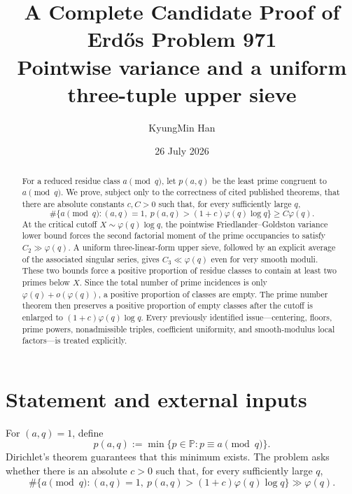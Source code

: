 \documentclass[11pt]{article}
\title{\bfseries A Complete Candidate Proof of Erd\H{o}s Problem 971\\[0.4em]
\large Pointwise variance and a uniform three-tuple upper sieve}
\author{KyungMin Han}
\date{26 July 2026}
\theoremstyle{definition}
\theoremstyle{remark}
\newcommand{\ph}{\varphi}
\newcommand{\Pp}{\mathbb P}
\newcommand{\1}{\mathbf 1}
\begin{document}
\maketitle



\begin{center}
\end{center}

\begin{abstract}
For a reduced residue class $a\pmod q$, let $p(a,q)$ be the least prime congruent to $a\pmod q$.
We prove, subject only to the correctness of cited published theorems, that there are absolute constants $c,C>0$ such that, for every sufficiently large $q$,
\[
 \#\{a\pmod q:(a,q)=1,\ p(a,q)>(1+c)\ph(q)\log q\}\ge C\ph(q).
\]
At the critical cutoff $X\sim\ph(q)\log q$, the pointwise Friedlander--Goldston variance lower bound forces the second factorial moment of the prime occupancies to satisfy $C_2\gg\ph(q)$.
A uniform three-linear-form upper sieve, followed by an explicit average of the associated singular series, gives $C_3\ll\ph(q)$ even for very smooth moduli.
These two bounds force a positive proportion of residue classes to contain at least two primes below $X$.
Since the total number of prime incidences is only $\ph(q)+o(\ph(q))$, a positive proportion of classes are empty.
The prime number theorem then preserves a positive proportion of empty classes after the cutoff is enlarged to $(1+c)\ph(q)\log q$.
Every previously identified issue---centering, floors, prime powers, nonadmissible triples, coefficient uniformity, and smooth-modulus local factors---is treated explicitly.
\end{abstract}

\tableofcontents

\section{Statement and external inputs}

For $(a,q)=1$, define
\[
 p(a,q):=\min\{p\in\Pp:p\equiv a\pmod q\}.
\]
Dirichlet's theorem guarantees that this minimum exists.
The problem asks whether there is an absolute $c>0$ such that, for every sufficiently large $q$,
\begin{equation}\label{eq:target}
 \#\{a\pmod q:(a,q)=1,\ p(a,q)>(1+c)\ph(q)\log q\}\gg\ph(q).
\end{equation}
\end{document}
